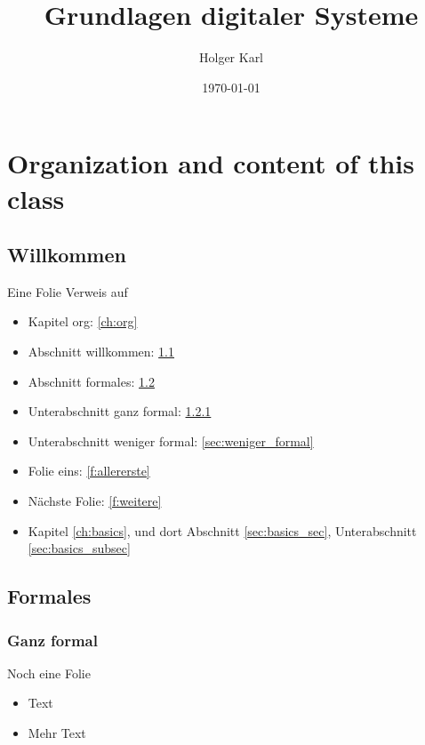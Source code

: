 \documentclass[a4paper,twoside,11pt]{book}
\author{Holger Karl}
\date{\today}
\title{Grundlagen digitaler Systeme}
\begin{document}
\maketitle
\setcounter{chapter}{-1}

\tableofcontents 



\chapter{Organization and content  of this class}
\label{sec:org0624cd8}

\label{ch:org}
\maketitle 


\section{Willkommen}
\label{sec:intro:willkommen}
\begin{frame}[label={f:allererste}]{Eine Folie}
Verweis auf 
\begin{itemize}
\item Kapitel org: \ref{ch:org}
\item Abschnitt willkommen:  \ref{sec:intro:willkommen}
\item Abschnitt formales: \ref{sec:intro:formales}
\item Unterabschnitt ganz formal: \ref{sec:ganz_formal}
\item Unterabschnitt weniger formal: \ref{sec:weniger_formal}
\item Folie eins: \ref{f:allererste}
\item Nächste Folie: \ref{f:weitere}
\item Kapitel \ref{ch:basics}, und dort Abschnitt \ref{sec:basics_sec}, Unterabschnitt \ref{sec:basics_subsec}
\end{itemize}
\end{frame}


\section{Formales}
\label{sec:intro:formales}
\subsection{Ganz formal}
\label{sec:ganz_formal}
\begin{frame}[label={f:weitere}]{Noch eine Folie}
\begin{itemize}
\item Text
\item Mehr Text
\end{itemize}
\end{frame}
\end{document}
